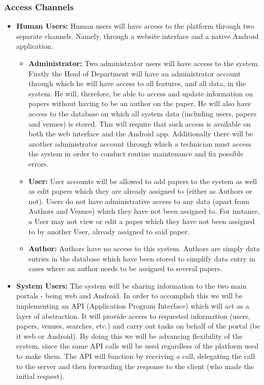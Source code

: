 \documentclass[a4paper,12pt]{article}
\begin{document}
\subsubsection{Access Channels}
\begin{itemize}
\item \textbf{Human Users:}
Human users will have access to the platform through two separate channels. Namely, through a website interface and a native Android application. 
\begin{itemize}
\item \textbf{Administrator:} Two administrator users will have access to the system. Firstly the Head of Department will have an administrator account through which he will have access to all features, and all data, in the system. He will, therefore, be able to access and update information on papers without having to be an author on the paper. He will also have access to the database on which all system data (including users, papers and venues) is stored. This will require that such access is available on both the web interface and the Android app. Additionally there will be another administrator account through which a technician must access the system in order to conduct routine maintenance and fix possible errors.
\item \textbf{User:} User accounts will be allowed to add papers to the system as well as edit papers which they are already assigned to (either as Authors or not). Users do not have administrative access to any data (apart from Authors and Venues) which they have not been assigned to. For instance, a User may not view or edit a paper which they have not been assigned to by another User, already assigned to said paper.
\item \textbf{Author:} Authors have no access to this system. Authors are simply data entries in the database which have been stored to simplify data entry in cases where an author needs to be assigned to several papers.
\end{itemize}
\item \textbf{System Users:}
The system will be sharing information to the two main portals - being web and Android. In order to accomplish this we will be implementing an API (Application Program Interface) which will act as a layer of abstraction. It will provide access to requested information (users, papers, venues, searches, etc.) and carry out tasks on behalf of the portal (be it web or Android). By doing this we will be advancing flexibility of the system, since the same API calls will be used regardless of the platform used to make them. The API will function by receiving a call, delegating the call to the server and then forwarding the response to the client (who made the initial request).


\end{itemize}
\end{document}
